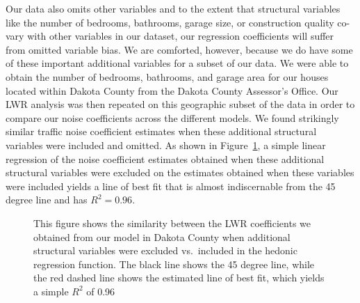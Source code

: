 \documentclass{article}\usepackage{graphicx, color}
\begin{document}
Our data also omits other variables and to the extent that structural variables like the number of bedrooms, bathrooms, garage size, or construction quality co-vary with other variables in our dataset, our regression coefficients will suffer from omitted variable bias. We are comforted, however, because we do have some of these important additional variables for a subset of our data. We were able to obtain the number of bedrooms, bathrooms, and garage area for our houses located within Dakota County from the Dakota County Assessor's Office. Our LWR analysis was then repeated on this geographic subset of the data in order to compare our noise coefficients across the different models. We found strikingly similar traffic noise coefficient estimates when these additional structural variables were included and omitted. As shown in Figure~\ref{fig:DAK}, a simple linear regression of the noise coefficient estimates obtained when these additional structural variables were excluded on the estimates obtained when these variables were included yields a line of best fit that is almost indiscernable from the 45 degree line and has $R^2 = 0.96$. %

\begin{figure}
\caption{This figure shows the similarity between the LWR coefficients we obtained from our model in Dakota County when additional structural variables were excluded vs.\ included in the hedonic regression function. The black line shows the 45 degree line, while the red dashed line shows the estimated line of best fit, which yields a simple $R^2$ of 0.96}\label{fig:DAK}
\end{figure}
\end{document}
